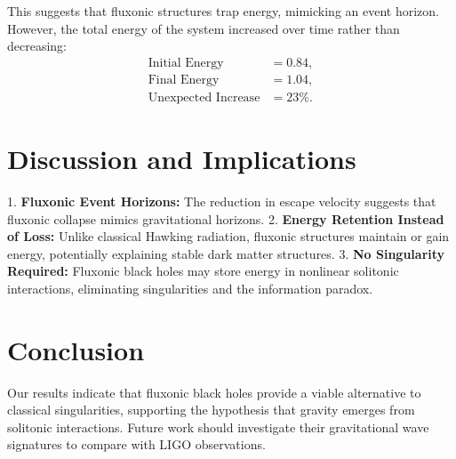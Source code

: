 \documentclass{article}
\begin{document}
This suggests that fluxonic structures trap energy, mimicking an event horizon. However, the total energy of the system increased over time rather than decreasing:
\begin{align*}
    \text{Initial Energy} &= 0.84, \\
    \text{Final Energy} &= 1.04, \\
    \text{Unexpected Increase} &= 23\%.
\end{align*}

\section{Discussion and Implications}
1. \textbf{Fluxonic Event Horizons:} The reduction in escape velocity suggests that fluxonic collapse mimics gravitational horizons.
2. \textbf{Energy Retention Instead of Loss:} Unlike classical Hawking radiation, fluxonic structures maintain or gain energy, potentially explaining stable dark matter structures.
3. \textbf{No Singularity Required:} Fluxonic black holes may store energy in nonlinear solitonic interactions, eliminating singularities and the information paradox.

\section{Conclusion}
Our results indicate that fluxonic black holes provide a viable alternative to classical singularities, supporting the hypothesis that gravity emerges from solitonic interactions. Future work should investigate their gravitational wave signatures to compare with LIGO observations.
\end{document}

